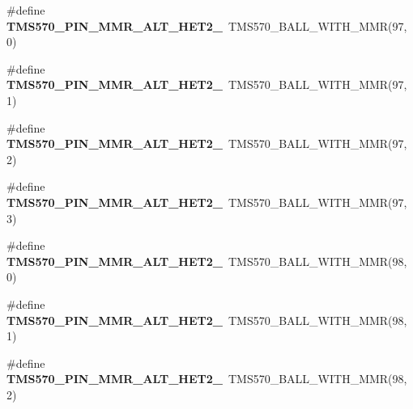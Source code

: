\begin{DoxyCompactItemize}
\item 
\mbox{\label{tms570lc4357-pins_8h_ad8ae2ea2652a92d5de993032ea719f41}} 
\#define {\bfseries T\+M\+S570\+\_\+\+P\+I\+N\+\_\+\+M\+M\+R\+\_\+\+A\+L\+T\+\_\+\+H\+E\+T2\+\_}~T\+M\+S570\+\_\+\+B\+A\+L\+L\+\_\+\+W\+I\+T\+H\+\_\+\+M\+MR(97, 0)
\item 
\mbox{\label{tms570lc4357-pins_8h_a3a2ba1ef9df59679da01ac4eb5e042b7}} 
\#define {\bfseries T\+M\+S570\+\_\+\+P\+I\+N\+\_\+\+M\+M\+R\+\_\+\+A\+L\+T\+\_\+\+H\+E\+T2\+\_}~T\+M\+S570\+\_\+\+B\+A\+L\+L\+\_\+\+W\+I\+T\+H\+\_\+\+M\+MR(97, 1)
\item 
\mbox{\label{tms570lc4357-pins_8h_a12b6d5567e1b5e37a7c2cfd35c770869}} 
\#define {\bfseries T\+M\+S570\+\_\+\+P\+I\+N\+\_\+\+M\+M\+R\+\_\+\+A\+L\+T\+\_\+\+H\+E\+T2\+\_}~T\+M\+S570\+\_\+\+B\+A\+L\+L\+\_\+\+W\+I\+T\+H\+\_\+\+M\+MR(97, 2)
\item 
\mbox{\label{tms570lc4357-pins_8h_a02d2e9a8dc52e7cc4fde3a046c177f52}} 
\#define {\bfseries T\+M\+S570\+\_\+\+P\+I\+N\+\_\+\+M\+M\+R\+\_\+\+A\+L\+T\+\_\+\+H\+E\+T2\+\_}~T\+M\+S570\+\_\+\+B\+A\+L\+L\+\_\+\+W\+I\+T\+H\+\_\+\+M\+MR(97, 3)
\item 
\mbox{\label{tms570lc4357-pins_8h_ad823822d9151c977fee25e9d22377a4d}} 
\#define {\bfseries T\+M\+S570\+\_\+\+P\+I\+N\+\_\+\+M\+M\+R\+\_\+\+A\+L\+T\+\_\+\+H\+E\+T2\+\_}~T\+M\+S570\+\_\+\+B\+A\+L\+L\+\_\+\+W\+I\+T\+H\+\_\+\+M\+MR(98, 0)
\item 
\mbox{\label{tms570lc4357-pins_8h_a5f23ebf97266f9b0ca2f1ead12cb6a12}} 
\#define {\bfseries T\+M\+S570\+\_\+\+P\+I\+N\+\_\+\+M\+M\+R\+\_\+\+A\+L\+T\+\_\+\+H\+E\+T2\+\_}~T\+M\+S570\+\_\+\+B\+A\+L\+L\+\_\+\+W\+I\+T\+H\+\_\+\+M\+MR(98, 1)
\item 
\mbox{\label{tms570lc4357-pins_8h_ac53545f11055b823e8922ee13d6270e2}} 
\#define {\bfseries T\+M\+S570\+\_\+\+P\+I\+N\+\_\+\+M\+M\+R\+\_\+\+A\+L\+T\+\_\+\+H\+E\+T2\+\_}~T\+M\+S570\+\_\+\+B\+A\+L\+L\+\_\+\+W\+I\+T\+H\+\_\+\+M\+MR(98, 2)
\item 
\mbox{\label{tms570lc4357-pins_8h_acb4ad718cdc72ccd8805e00d18c57b8b}} 

\end{DoxyCompactItemize}
